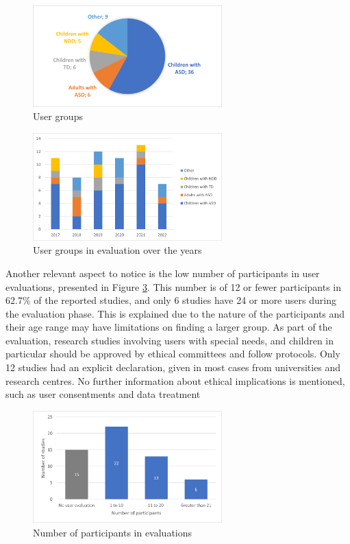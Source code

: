 \documentclass[a4paper,fleqn]{cas-sc}
\begin{document}
\begin{figure}
	\includegraphics[width=0.65\textwidth]{fig2_user-group-general.png}
        \centering
	  \caption{User groups}
        \label{fig:user-groups-general}
\end{figure}

\begin{figure}
	\includegraphics[width=0.65\textwidth]{fig3_user-group-years.png}
        \centering
	  \caption{User groups in evaluation over the years}
        \label{fig:user-groups-years}
\end{figure}

Another relevant aspect to notice is the low number of participants in user evaluations, presented in Figure \ref{fig:user-count-eval}. This number is of 12 or fewer participants in 62.7\% of the reported studies, and only 6 studies have 24 or more users during the evaluation phase. This is explained due to the nature of the participants and their age range may have limitations on finding a larger group. 
As part of the evaluation, research studies involving users with special needs, and children in particular should be approved by ethical committees and follow protocols. Only 12 studies had an explicit declaration, given in most cases from universities and research centres. No further information about ethical implications is mentioned, such as user consentments and data treatment

\begin{figure}
	\includegraphics[width=0.65\textwidth]{fig4_user-number-eval.png}
        \centering
	  \caption{Number of participants in evaluations}\label{fig:user-count-eval}
\end{figure}
\end{document}
